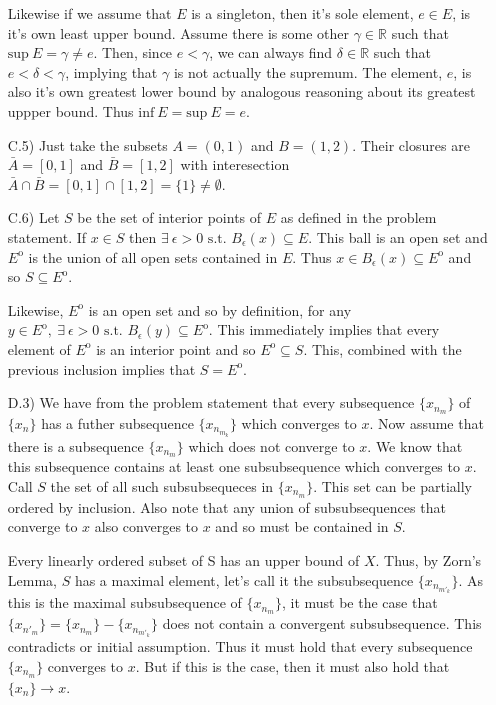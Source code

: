\documentclass[11pt,letter]{article}
\begin{document}
\begin{enumerate}
    Likewise if we assume that $E$ is a singleton, then it's sole element, $e \in E$, is it's own least upper bound. Assume there is some other $\gamma \in \mathbb{R}$ such that $\text{sup}\ E = \gamma \ne e$. Then, since $e < \gamma$, we can always find $\delta \in \mathbb{R}$ such that $e < \delta < \gamma$, implying that $\gamma$ is not actually the supremum. The element, $e$, is also it's own greatest lower bound by analogous reasoning about its greatest uppper bound. Thus $\text{inf}\ E = \text{sup}\ E = e$.

    \item[C.5)] Just take the subsets $A = (0,1)$ and $B = (1,2)$. Their closures are $\bar{A} = [0,1]$ and $\bar{B} = [1,2]$ with interesection $\bar{A} \cap \bar{B} = [0,1] \cap [1,2] = \{1\} \ne \emptyset$.

    \item[C.6)] Let $S$ be the set of interior points of $E$ as defined in the problem statement. If $x \in S$ then $\exists\ \epsilon > 0 \text{ s.t. } B_\epsilon(x) \subseteq E$. This ball is an open set and $E^\mathrm{o}$ is the union of all open sets contained in $E$. Thus $x \in B_\epsilon(x) \subseteq E^\mathrm{o}$ and so $S \subseteq E^\mathrm{o}$.

    Likewise, $E^\mathrm{o}$ is an open set and so by definition, for any $y \in E^\mathrm{o},\ \exists\ \epsilon > 0 \text{ s.t. } B_\epsilon(y) \subseteq E^\mathrm{o}$. This immediately implies that every element of $E^\mathrm{o}$ is an interior point and so $E^\mathrm{o} \subseteq S$. This, combined with the previous inclusion implies that $S = E^\mathrm{o}$.

    \item[D.3)] We have from the problem statement that every subsequence $\{x_{n_m}\}$ of $\{x_n\}$ has a futher subsequence $\{x_{n_{m_k}}\}$ which converges to $x$. Now assume that there is a subsequence $\{x_{n_m}\}$ which does not converge to $x$. We know that this subsequence contains at least one subsubsequence which converges to $x$. Call $S$ the set of all such subsubsequeces in $\{x_{n_m}\}$. This set can be partially ordered by inclusion. Also note that any union of subsubsequences that converge to $x$ also converges to $x$ and so must be contained in $S$.
    
    Every linearly ordered subset of S has an upper bound of $X$. Thus, by Zorn's Lemma, $S$ has a maximal element, let's call it the subsubsequence $\{x_{n_{m'_k}}\}$. As this is the maximal subsubsequence of $\{x_{n_m}\}$, it must be the case that $\{x_{n'_m}\} = \{x_{n_m}\} - \{x_{n_{m'_k}}\}$ does not contain a convergent subsubsequence. This contradicts or initial assumption. Thus it must hold that every subsequence $\{x_{n_m}\}$ converges to $x$. But if this is the case, then it must also hold that $\{x_n\} \rightarrow x$.


\end{enumerate}
\end{document}
